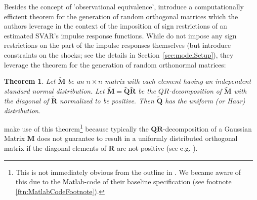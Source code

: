 \documentclass[a4paper,11pt,listof=nochaptergap,oneside,pointednumbers,bibtotoc,bigheadings,liststotoc]{scrbook}
\theoremstyle{mysatz}
\theoremstyle{mydefinition}
\theoremstyle{mytheorem}
\newtheorem{theo}[satz]{Theorem}
\theoremstyle{mybemerkung}
\newcommand{\vect}[1]{\boldsymbol{\mathbf{#1}}}
\begin{document}
Besides the concept of 'observational equivalence', \citet{rubioetal:10} introduce a computationally efficient theorem for the generation of random orthogonal matrices which the authors leverage in the context of the imposition of sign restrictions of an estimated SVAR's impulse response functions. While \citet{ludvigsonetal:18} do not impose any sign restrictions on the part of the impulse responses themselves (but introduce constraints on the shocks; see the details in Section~\ref{sec:modelSetup}), they leverage the theorem for the generation of random orthonormal matrices:

\begin{theo}
Let $\widetilde{\vect{M}}$ be an $n\times n$ matrix with each element having an independent standard normal distribution. Let $\widetilde{\vect{M}} = \widetilde{\vect{Q}}\widetilde{\vect{R}}$ be the $QR$-decomposition of $\widetilde{\vect{M}}$ with the diagonal of $\widetilde{\vect{R}}$ normalized to be positive. Then $\widetilde{\vect{Q}}$ has the uniform (or Haar) distribution.
\end{theo}

\citet{ludvigsonetal:18} make use of this theorem\footnote{This is not immediately obvious from the outline in \citet{ludvigsonetal:18}. We became aware of this due to the Matlab-code of their baseline specification (see footnote \ref{ftn:MatlabCodeFootnote}).} because typically the $\vect{QR}$-decomposition of a Gaussian Matrix $\vect{M}$ does not guarantee to result in a uniformly distributed orthogonal matrix if the diagonal elements of $\vect{R}$ are not positive (see e.g. \citealp{edelman:05}).
\end{document}
